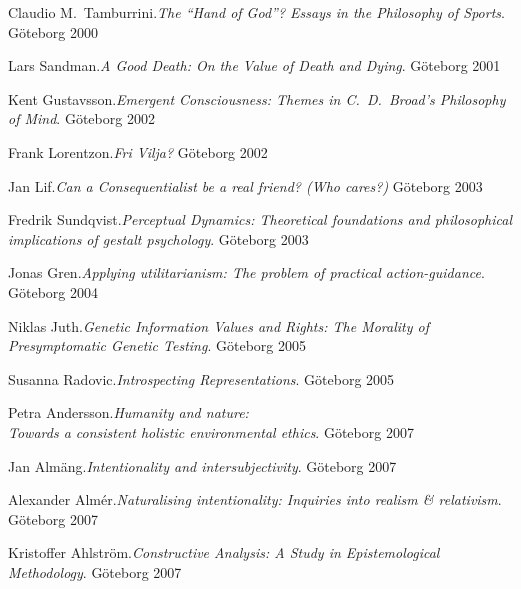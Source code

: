 \documentclass[fontsize=14pt,
               paper=297mm:210mm,
               twoside,
               pagesize=pdftex,
               DIV=calc
]{scrbook}
\begin{document}
\begin{multicols*}{2}
\begin{Volumes}
\item Claudio M.~Tamburrini.\enspace\textit{The ``Hand of God''? Essays in the Philosophy of Sports}. \mbox{G\"oteborg} 2000

\columnbreak

\item Lars Sandman.\enspace\textit{A Good Death: On the Value of Death and Dying}. \mbox{G\"oteborg} 2001

\item Kent Gustavsson.\enspace\textit{Emergent Consciousness: Themes in C.~D.~Broad's Philosophy of Mind}. \mbox{G\"oteborg} 2002

\item Frank Lorentzon.\enspace\negthinspace\negthinspace\textit{Fri Vilja?} \mbox{G\"oteborg} 2002

\item Jan Lif.\enspace\textit{Can a Consequentialist be a real friend? (Who cares?)} \mbox{G\"oteborg} 2003

\item Fredrik Sundqvist.\enspace\textit{Perceptual Dynamics: Theoretical foundations and philosophical implications of gestalt psychology}. \mbox{G\"oteborg} 2003

\item Jonas Gren.\enspace\textit{Applying utilitarianism: The problem of practical action-guidance}. \mbox{G\"oteborg} 2004

\item Niklas Juth.\enspace\textit{Genetic Information Values and Rights: The Morality of Presymptomatic Genetic Testing}. \mbox{G\"oteborg} 2005

\item Susanna Radovic.\enspace\textit{Introspecting Representations}. \mbox{G\"oteborg} 2005

\item Petra Andersson.\enspace\textit{Humanity and nature:\\ Towards a consistent holistic environmental ethics}. \mbox{G\"oteborg} 2007

\item Jan Alm\"ang.\enspace\textit{Intentionality and intersubjectivity}. \mbox{G\"oteborg} 2007

\item Alexander Alm\'{e}r.\enspace\textit{Naturalising intentionality: Inquiries into realism \& relativism}. \mbox{G\"oteborg} 2007

\item Kristoffer Ahlstr\"om.\enspace\textit{Constructive Analysis: A Study in Epistemological Methodology}. \mbox{G\"oteborg} 2007


\end{Volumes}
\end{multicols*}
\end{document}
